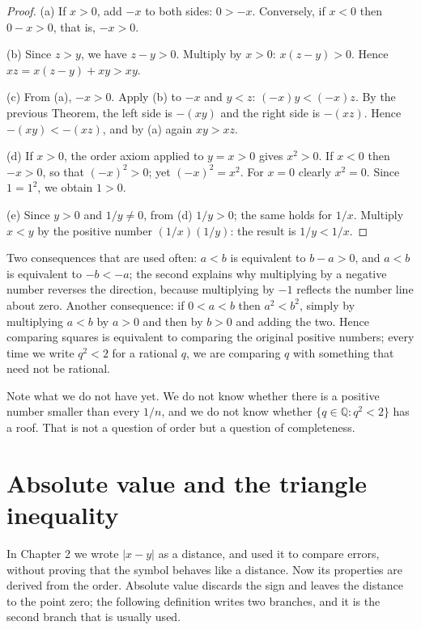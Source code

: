 \begin{proof}
(a) If $x>0$, add $-x$ to both sides: $0>-x$. Conversely, if $x<0$ then
$0-x>0$, that is, $-x>0$.

(b) Since $z>y$, we have $z-y>0$. Multiply by $x>0$: $x(z-y)>0$. Hence
$xz=x(z-y)+xy>xy$.

(c) From (a), $-x>0$. Apply (b) to $-x$ and $y<z$: $(-x)y<(-x)z$. By the previous
Theorem, the left side is $-(xy)$ and the right side is $-(xz)$. Hence
$-(xy)<-(xz)$, and by (a) again $xy>xz$.

(d) If $x>0$, the order axiom applied to $y=x>0$ gives $x^2>0$. If $x<0$ then
$-x>0$, so that $(-x)^2>0$; yet $(-x)^2=x^2$. For $x=0$ clearly $x^2=0$. Since
$1=1^2$, we obtain $1>0$.

(e) Since $y>0$ and $1/y\neq 0$, from (d) $1/y>0$; the same holds for $1/x$.
Multiply $x<y$ by the positive number $(1/x)(1/y)$: the result is $1/y<1/x$.
\end{proof}

Two consequences that are used often: $a<b$ is equivalent to $b-a>0$, and $a<b$ is
equivalent to $-b<-a$; the second explains why multiplying by a negative number
reverses the direction, because multiplying by $-1$ reflects the number line about
zero. Another consequence: if $0<a<b$ then $a^2<b^2$, simply by multiplying $a<b$ by
$a>0$ and then by $b>0$ and adding the two. Hence comparing squares is equivalent to
comparing the original positive numbers; every time we write $q^2<2$ for a rational
$q$, we are comparing $q$ with something that need not be rational.


Note what we do not have yet. We do not know whether there is a positive number smaller
than every $1/n$, and we do not know whether $\{q\in\mathbb{Q}: q^2<2\}$ has a roof.
That is not a question of order but a question of completeness.

\section{Absolute value and the triangle inequality}

In Chapter 2 we wrote $|x-y|$ as a distance, and used it to compare errors, without
proving that the symbol behaves like a distance. Now its properties are derived from
the order. Absolute value discards the sign and leaves the distance to the point zero;
the following definition writes two branches, and it is the second branch that is
usually used.

